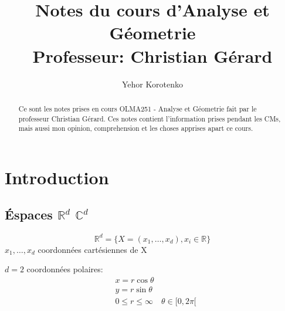 \documentclass[a4paper]{report}
\author{Yehor Korotenko}
\title{Notes du cours d'Analyse et Géometrie\\\vspace{1cm}
\Large Professeur: Christian Gérard \normalsize}
\newcommand\R{\ensuremath{\mathbb{R}}}
\newcommand\C{\ensuremath{\mathbb{C}}}
\theoremstyle{definition}
\begin{document}
\maketitle

\begin{abstract}
    Ce sont les notes prises en cours OLMA251 - Analyse et Géometrie fait par le professeur Christian Gérard. Ces notes contient l'information prises pendant les CMs, mais aussi mon opinion, comprehension et les choses apprises apart ce cours.
\end{abstract}


\tableofcontents


\chapter{Introduction}
\section{Éspaces $\R^d$  $\C^d$}
\begin{definition}
    \[
        \R^d = \{ X = (x_1, \ldots, x_d), x_i \in \R\}
    \] 
    $x_1, \ldots, x_d$ coordonnées cartésiennes de X
\end{definition}
\begin{eg}
   $d = 2$ coordonnées polaires:  
   \begin{align*}
      &x = r \cos \theta \\
        & y = r \sin \theta\\
        &0 \le r \le  \infty \quad \theta \in [0, 2\pi[
   \end{align*}
   \begin{center}
       
\end{center}
\end{eg}
\end{document}
